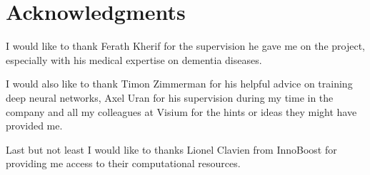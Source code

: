 \chapter{Acknowledgments}
I would like to thank Ferath Kherif for the supervision he gave me on the project, especially with his medical expertise on dementia diseases.

I would also like to thank Timon Zimmerman for his helpful advice on training deep neural networks, Axel Uran for his supervision during my time in the company and all my colleagues at Visium\footnotemark{} for the hints or ideas they might have provided me.

Last but not least I would like to thanks Lionel Clavien from InnoBoost\footnotemark{} for providing me access to their computational resources.


